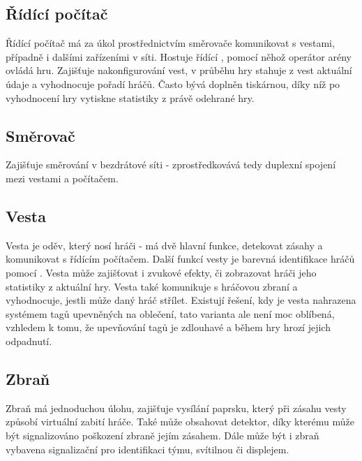 \subsection{Řídící počítač}
Řídící počítač má za úkol prostřednictvím směrovače komunikovat s vestami, případně i dalšími zařízeními v síti. Hostuje řídící , pomocí něhož operátor arény ovládá hru. Zajišťuje nakonfigurování vest, v průběhu hry stahuje z vest aktuální údaje a vyhodnocuje pořadí hráčů. Často bývá doplněn tiskárnou, díky níž po vyhodnocení hry vytiskne statistiky z právě odehrané hry.

\subsection{Směrovač}
Zajišťuje směrování v bezdrátové síti - zprostředkovává tedy duplexní spojení mezi vestami a počítačem.

\subsection{Vesta}
Vesta je oděv, který nosí hráči - má dvě hlavní funkce, detekovat zásahy a komunikovat s řídícím počítačem. Další funkcí vesty je barevná identifikace hráčů pomocí  . Vesta může zajišťovat i zvukové efekty, či zobrazovat hráči jeho statistiky z aktuální hry. Vesta také komunikuje s hráčovou zbraní a vyhodnocuje, jestli může daný hráč střílet. Existují řešení, kdy je vesta nahrazena systémem tagů upevněných na oblečení, tato varianta ale není moc oblíbená, vzhledem k tomu, že upevňování tagů je zdlouhavé a během hry hrozí jejich odpadnutí.

\subsection{Zbraň}
Zbraň má jednoduchou úlohu, zajišťuje vysílání  paprsku, který při zásahu vesty způsobí virtuální zabití hráče. Také může obsahovat  detektor, díky kterému může být signalizováno poškození zbraně jejím zásahem. Dále může být i zbraň vybavena signalizační   pro identifikaci týmu, svítilnou či displejem.
